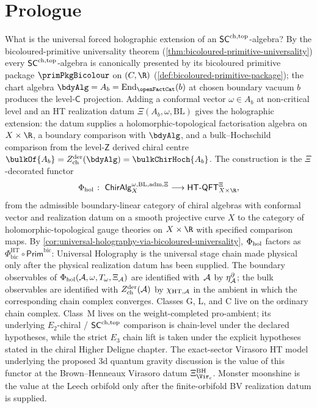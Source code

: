 \section*{Prologue}

What is the universal forced holographic extension of an
$\mathsf{SC}^{\mathrm{ch},\mathrm{top}}$-algebra? By the bicoloured-primitive universality
theorem
\textup(\cref{thm:bicoloured-primitive-universality}\textup) every
$\mathsf{SC}^{\mathrm{ch},\mathrm{top}}$-algebra is canonically presented by its bicoloured
primitive package
$\primPkgBicolour$
on $(C, \R)$
\textup(\cref{def:bicoloured-primitive-package}\textup); the chart
algebra $\bdyAlg = A_b = \mathrm{End}_{\openFactCat}(b)$ at chosen
boundary vacuum $b$ produces the level-$\mathsf{C}$ projection.
Adding a conformal vector $\omega \in A_b$ at non-critical level
and an HT realization datum
\(\Xi(A_b,\omega,\mathrm{BL})\) gives the holographic extension:
the datum supplies a holomorphic-topological factorisation algebra
on $X \times \R$, a boundary comparison with $\bdyAlg$, and a
bulk--Hochschild comparison from the level-$\mathsf{Z}$ derived
chiral centre
$\bulkOf{A_b} = \Zder(\bdyAlg) = \bulkChirHoch{A_b}$. The
construction is the $\Xi$-decorated functor
\[
 \Phihol
 \;\colon\;
 \ChirAlg^{\omega,\mathrm{BL,adm},\Xi}_X
 \longrightarrow
 \HTQFT^{\Xi}_{X \times \R},
\]
from the admissible boundary-linear category of chiral algebras with
conformal vector and realization datum on a smooth projective curve
$X$ to the category of holomorphic-topological gauge theories on
$X \times \R$ with specified comparison maps. By
\cref{cor:universal-holography-via-bicoloured-universality}, $\Phi_{\mathrm{hol}}$
factors as
$\Phi^{\mathrm{HT}}_{\mathrm{bic}} \circ \mathsf{Prim}^{\mathrm{bic}}$:
Universal Holography is the universal stage chain made physical only
after the physical realization datum has been supplied. The boundary
observables of $\Phi_{\mathrm{hol}}(\mathcal{A},\omega,T_\omega,\Xi_{\mathcal{A}})$
are identified with~$\mathcal{A}$ by
\(\eta^\partial_{\mathcal{A}}\); the bulk observables are identified with
\(Z^{\mathrm{der}}_{\mathrm{ch}}(\mathcal{A})\) by
\(\chi_{\mathrm{HT},\mathcal{A}}\) in the ambient in which the corresponding
chain complex converges. Classes G, L, and C live on the ordinary
chain complex. Class~M lives on the weight-completed pro-ambient; its
underlying $E_2$-chiral / $\mathsf{SC}^{\mathrm{ch},\mathrm{top}}$ comparison is chain-level under
the declared hypotheses, while the strict $E_3$ chain lift is taken
under the explicit hypotheses stated in the chiral Higher Deligne
chapter. The exact-sector Virasoro HT model underlying the proposed
3d quantum gravity discussion is the value of this functor at the
Brown--Henneaux Virasoro datum
\(\Xi_{\Vir_c}^{\mathrm{BH}}\). Monster moonshine is the value at the
Leech orbifold only after the finite-orbifold BV realization datum is
supplied.

